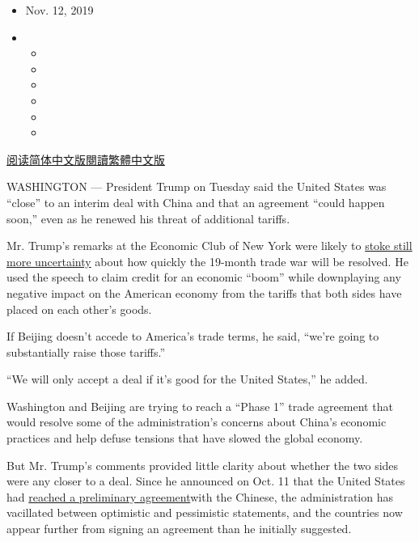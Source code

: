 \begin{itemize}
\item
  Nov. 12, 2019
\item
  \begin{itemize}
  \item
  \item
  \item
  \item
  \item
  \item
  \end{itemize}
\end{itemize}

\href{https://cn.nytimes.com/business/20191113/trump-trade-economy/}{阅读简体中文版}\href{https://cn.nytimes.com/business/20191113/trump-trade-economy/zh-hant/}{閱讀繁體中文版}

WASHINGTON --- President Trump on Tuesday said the United States was
``close'' to an interim deal with China and that an agreement ``could
happen soon,'' even as he renewed his threat of additional tariffs.

Mr. Trump's remarks at the Economic Club of New York were likely to
\href{https://www.nytimes.com/2019/10/16/business/china-trade-deal-economy.html}{stoke
still more uncertainty} about how quickly the 19-month trade war will be
resolved. He used the speech to claim credit for an economic ``boom''
while downplaying any negative impact on the American economy from the
tariffs that both sides have placed on each other's goods.

If Beijing doesn't accede to America's trade terms, he said, ``we're
going to substantially raise those tariffs.''

``We will only accept a deal if it's good for the United States,'' he
added.

Washington and Beijing are trying to reach a ``Phase 1'' trade agreement
that would resolve some of the administration's concerns about China's
economic practices and help defuse tensions that have slowed the global
economy.

But Mr. Trump's comments provided little clarity about whether the two
sides were any closer to a deal. Since he announced on Oct. 11 that the
United States had
\href{https://www.nytimes.com/2019/10/11/business/economy/us-china-trade-deal.html}{reached
a preliminary agreement}with the Chinese, the administration has
vacillated between optimistic and pessimistic statements, and the
countries now appear further from signing an agreement than he initially
suggested.


